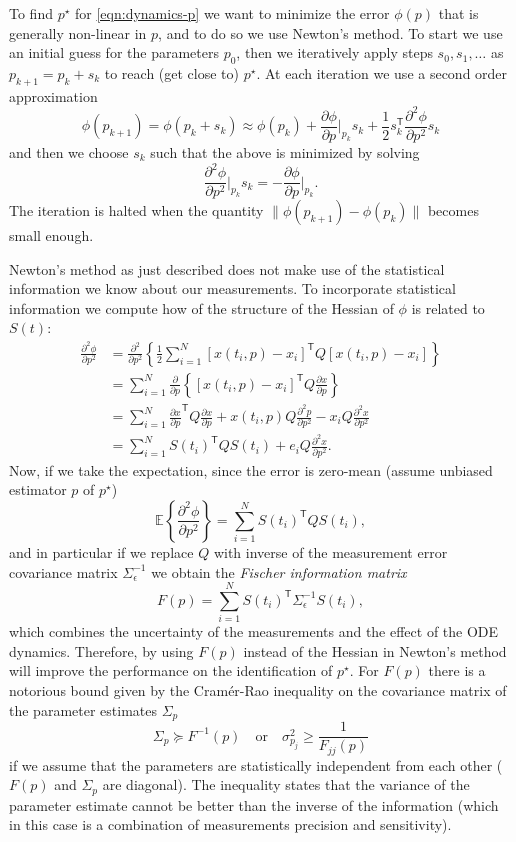 \documentclass[a4paper]{article}
\newcommand{\T}{\mathsf{T}}
\newcommand{\E}[2][]{\mathbb{E}_{#1}\left\{#2\right\}}
\theoremstyle{plain}
\theoremstyle{definition}
\theoremstyle{remark}
\begin{document}
To find $p^\star$ for \eqref{eqn:dynamics-p} we want to minimize the error
$\phi(p)$ that is generally non-linear in $p$, and to do so we use Newton's
method. To start we use an initial guess for the parameters $p_0$, then we
iteratively apply steps $s_0, s_1, \ldots$ as $p_{k+1} = p_k + s_k$ to reach
(get close to) $p^\star$. At each iteration we use a second order
approximation
\[
  \phi(p_{k+1}) = \phi(p_k + s_k) \approx \phi(p_k)
    + \frac{\partial \phi}{\partial p} \bigg|_{p_k} s_k
    + \frac{1}{2} s_k^\T \frac{\partial^2 \phi}{\partial p^2} s_k
\]
and then we choose $s_k$ such that the above is minimized by solving
\[
  \frac{\partial^2 \phi}{\partial p^2} \bigg|_{p_k} s_k
    = - \frac{\partial \phi}{\partial p} \bigg|_{p_k}.
\]
The iteration is halted when the quantity $\|\phi(p_{k+1}) - \phi(p_k)\|$
becomes small enough.

Newton's method as just described does not make use of the statistical
information we know about our measurements. To incorporate statistical
information we compute how of the structure of the Hessian of $\phi$ is
related to $S(t)$:
\begin{align*}
  \frac{\partial^2 \phi}{\partial p^2}
    &= \frac{\partial^2}{\partial p^2} \left\{
        \frac{1}{2} \sum_{i=1}^N [x(t_i, p) - x_i]^\T Q [x(t_i, p) - x_i]
      \right\} \\
    &= \sum_{i=1}^N \frac{\partial}{\partial p} \left\{
        [x(t_i, p) - x_i]^\T Q \frac{\partial x}{\partial p}
      \right\} \\
    &= \sum_{i=1}^N \frac{\partial x}{\partial p}^\T Q
      \frac{\partial x}{\partial p} + x(t_i, p) Q\frac{\partial^2 p}{\partial p^2}
      - x_i Q \frac{\partial^2 x}{\partial p^2} \\
    &= \sum_{i=1}^N S(t_i)^\T Q S(t_i)
      + e_i Q \frac{\partial^2 x}{\partial p^2}.
\end{align*}
Now, if we take the expectation, since the error is zero-mean (assume unbiased
estimator $p$ of $p^\star$)
\[
  \E{\frac{\partial^2 \phi}{\partial p^2}} = \sum_{i=1}^N S(t_i)^\T Q S(t_i),
\]
and in particular if we replace $Q$ with inverse of the measurement error
covariance matrix $\Sigma_\epsilon^{-1}$ we obtain the \emph{Fischer
information matrix}
\[
  F(p) = \sum_{i=1}^N S(t_i)^\T \Sigma_\epsilon^{-1} S(t_i),
\]
which combines the uncertainty of the measurements and the effect of the ODE
dynamics. Therefore, by using $F(p)$ instead of the Hessian in Newton's method
will improve the performance on the identification of $p^\star$. For $F(p)$
there is a notorious bound given by the Cramér-Rao inequality on the
covariance matrix of the parameter estimates $\Sigma_p$
\[
  \Sigma_p \succeq F^{-1}(p)
  \quad\text{or}\quad
  \sigma_{p_j}^2 \geq \frac{1}{F_{jj}(p)}
\]
if we assume that the parameters are statistically independent from each other
($F(p)$ and $\Sigma_p$ are diagonal). The inequality states that the variance
of the parameter estimate cannot be better than the inverse of the information
(which in this case is a combination of measurements precision and
sensitivity).
\end{document}
